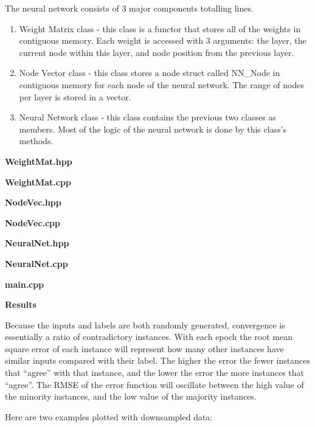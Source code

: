 \documentclass[14pt]{article}
\begin{document}
\begin{flushleft}
The neural network consists of 3 major components totalling lines.
\begin{enumerate}
	\item Weight Matrix class - this class is a functor that stores all of the weights in contiguous memory.
		Each weight is accessed with 3 arguments:
		the layer, the current node within this layer, and node position from the previous layer.
	\item Node Vector class - this class stores a node struct called NN\_Node in contiguous memory
		for each node of the neural network. The range of nodes per layer is stored in a vector.
	\item Neural Network class - this class contains the previous two classes as members.
		Most of the logic of the neural network is done by this class's methods.
\end{enumerate}


	\textbf{WeightMat.hpp}

	\textbf{WeightMat.cpp}


	\textbf{NodeVec.hpp}

	\textbf{NodeVec.cpp}


	\textbf{NeuralNet.hpp}

	\textbf{NeuralNet.cpp}


	\textbf{main.cpp}

\newpage
\textbf{Results}

Because the inputs and labels are both randomly generated,
convergence is essentially a ratio of contradictory instances.
With each epoch the root mean square error of each instance will represent
how many other instances have similar inputs compared with their label.
The higher the error the fewer instances that ``agree'' with that instance,
and the lower the error the more instances that ``agree''.
The RMSE of the error function will oscillate between the high value of the minority instances,
and the low value of the majority instances.

Here are two examples plotted with downsampled data:




\end{flushleft}
\end{document}
